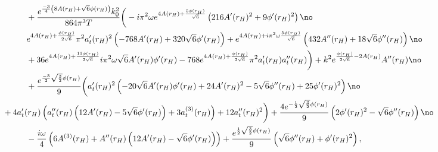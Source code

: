 \documentclass[preprintnumbers,aps,prd,longbibliography,nofootinbib,nobibnotes,amsmath,amssymb]{revtex4}
\begin{document}
\begin{align}
		&+\frac{e^{\frac{-3}{4}  \left(8 A(r_H)+\sqrt{6} \phi(r_H)\right)} k_0^2 }{864 \pi ^3 T} \bigg(- i \pi ^2 \omega e^{4 A(r_H)+\frac{5 \phi(r_H)}{\sqrt{6}}}  \left(216 A'(r_H)^2 + 9 \phi'(r_H)^2 \right)\no\\
		&  e^{4 A(r_H)+\frac{\phi(r_H)}{2 \sqrt{6}}} \pi ^2 a_t'(r_H)^2 \left(-768 A'(r_H) + 320 \sqrt{6}\phi'(r_H) \right) +e^{4 A(r_H)+ i \pi ^2 \omega  \frac{5 \phi(r_H)}{\sqrt{6}}}  \left(432 A''(r_H) + 18 \sqrt{6} \phi''(r_H)\right)\no\\
		&+36 e^{4 A(r_H)+\frac{11\phi(r_H)}{2 \sqrt{6}}} i \pi ^2 \omega  \sqrt{6} A'(r_H) \phi'(r_H)  -768 e^{4 A(r_H)+\frac{\phi(r_H)}{2 \sqrt{6}}} \pi ^2 a_t'(r_H) a_t''(r_H)  \bigg) +  k^2 e^{\frac{\phi(r_H)}{2 \sqrt{6}}-2 A(r_H)} A''(r_H) \no\\
		&+\frac{ e^{\frac{-3}{2}  \sqrt{\frac{3}{2}} \phi(r_H)}}{9} \bigg(a_t'(r_H)^2 \left(-20 \sqrt{6} A'(r_H) \phi'(r_H)+24 A'(r_H)^2-5 \sqrt{6} \phi''(r_H)+25 \phi'(r_H)^2\right)\no\\
		&\hspace{-1cm}+4 a_t'(r_H) \left(a_t''(r_H) \left(12 A'(r_H)-5 \sqrt{6} \phi'(r_H)\right)+3 a_t^{(3)}(r_H)\right)+12 a_t''(r_H)^2\bigg) +\frac{4 e^{-\frac{1}{2} \sqrt{\frac{3}{2}} \phi(r_H)}}{9} \left(2 \phi'(r_H)^2-\sqrt{6} \phi''(r_H)\right)\no\\
		&- \frac{i \omega}{4}  \left(6 A^{(3)}(r_H)+A''(r_H) \left(12 A'(r_H)-\sqrt{6} \phi'(r_H)\right)\right)+\frac{ e^{\frac{1}{2} \sqrt{\frac{3}{2}} \phi(r_H)}}{9} \left(\sqrt{6} \phi''(r_H)+\phi'(r_H)^2\right),\nonumber
		\end{align}
\end{document}
